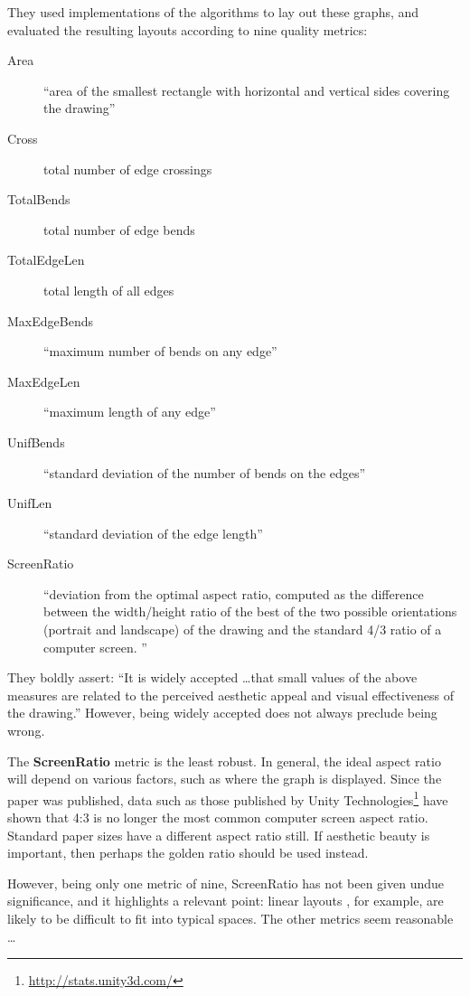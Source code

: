 They used implementations of the algorithms to lay out these graphs, and evaluated the resulting layouts according to nine quality metrics:

\begin{description}
    \item[Area]
``area of the smallest rectangle with horizontal and vertical sides covering the drawing''
    \item[Cross]
total number of edge crossings
    \item[TotalBends]
total number of edge bends
    \item[TotalEdgeLen]
total length of all edges
    \item[MaxEdgeBends]
``maximum number of bends on any edge''
    \item[MaxEdgeLen]
``maximum length of any edge''
    \item[UnifBends]
``standard deviation of the number of bends on the edges''
    \item[UnifLen]
``standard deviation of the edge length''
    \item[ScreenRatio]
``deviation from the optimal aspect ratio, computed as the difference between the width/height ratio of the best of the two possible orientations (portrait and landscape) of the drawing and the standard 4/3 ratio of a computer screen. ''
\end{description}

They boldly assert: ``It is widely accepted \ldots that small values of the above measures are related to the perceived aesthetic appeal and visual effectiveness of the drawing.''
However, being widely accepted does not always preclude being wrong.

The \textbf{ScreenRatio} metric is the least robust.
In general, the ideal aspect ratio will depend on various factors, such as where the graph is displayed.
Since the paper was published, data such as those published by Unity Technologies\footnote{\url{http://stats.unity3d.com/}} have shown that 4:3 is no longer the most common computer screen aspect ratio.
Standard paper sizes have a different aspect ratio still.
If aesthetic beauty is important, then perhaps the golden ratio  should be used instead.

However, being only one metric of nine, ScreenRatio has not been given undue significance, and it highlights a relevant point: linear layouts , for example, are likely to be difficult to fit into typical spaces.
The other metrics seem reasonable \ldots


